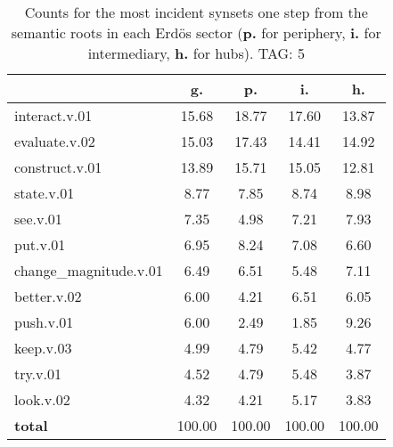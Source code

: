 \begin{table}[h!]
\begin{center}
\begin{tabular}{| l | c | c | c | c |}\hline
 & g. & p. & i. & h. \\\hline
interact.v.01 & 15.68  & 18.77  & 17.60  & 13.87 \\\hline
evaluate.v.02 & 15.03  & 17.43  & 14.41  & 14.92 \\\hline
construct.v.01 & 13.89  & 15.71  & 15.05  & 12.81 \\\hline
state.v.01 & 8.77  & 7.85  & 8.74  & 8.98 \\\hline
see.v.01 & 7.35  & 4.98  & 7.21  & 7.93 \\\hline
put.v.01 & 6.95  & 8.24  & 7.08  & 6.60 \\\hline
change\_magnitude.v.01 & 6.49  & 6.51  & 5.48  & 7.11 \\\hline
better.v.02 & 6.00  & 4.21  & 6.51  & 6.05 \\\hline
push.v.01 & 6.00  & 2.49  & 1.85  & 9.26 \\\hline
keep.v.03 & 4.99  & 4.79  & 5.42  & 4.77 \\\hline
try.v.01 & 4.52  & 4.79  & 5.48  & 3.87 \\\hline
look.v.02 & 4.32  & 4.21  & 5.17  & 3.83 \\\hline
{{\bf total}} & 100.00  & 100.00  & 100.00  & 100.00 \\\hline
\end{tabular}
\caption{Counts for the most incident synsets one step from the semantic roots in each Erd\"os sector ({\bf p.} for periphery, {\bf i.} for intermediary, {\bf h.} for hubs). TAG: 5}
\end{center}
\end{table}